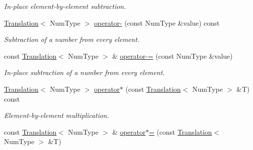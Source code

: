 \begin{DoxyCompactItemize}
\begin{DoxyCompactList}\small\item\em In-\/place element-\/by-\/element subtraction. \end{DoxyCompactList}\item 
\hypertarget{singletonscrews_1_1_translation_aa41f13916fce60d9775a0b6cb03a5952}{\hyperlink{singletonscrews_1_1_translation}{Translation}$<$ Num\+Type $>$ \hyperlink{singletonscrews_1_1_translation_aa41f13916fce60d9775a0b6cb03a5952}{operator-\/} (const Num\+Type \&value) const }\label{singletonscrews_1_1_translation_aa41f13916fce60d9775a0b6cb03a5952}

\begin{DoxyCompactList}\small\item\em Subtraction of a number from every element. \end{DoxyCompactList}\item 
\hypertarget{singletonscrews_1_1_translation_aafa1285cf0f6876d3b38bb3a61233f70}{const \hyperlink{singletonscrews_1_1_translation}{Translation}$<$ Num\+Type $>$ \& \hyperlink{singletonscrews_1_1_translation_aafa1285cf0f6876d3b38bb3a61233f70}{operator-\/=} (const Num\+Type \&value)}\label{singletonscrews_1_1_translation_aafa1285cf0f6876d3b38bb3a61233f70}

\begin{DoxyCompactList}\small\item\em In-\/place subtraction of a number from every element. \end{DoxyCompactList}\item 
\hypertarget{singletonscrews_1_1_translation_ad6490a44e641c53afb9e5fa41ac2971d}{\hyperlink{singletonscrews_1_1_translation}{Translation}$<$ Num\+Type $>$ \hyperlink{singletonscrews_1_1_translation_ad6490a44e641c53afb9e5fa41ac2971d}{operator$\ast$} (const \hyperlink{singletonscrews_1_1_translation}{Translation}$<$ Num\+Type $>$ \&T) const }\label{singletonscrews_1_1_translation_ad6490a44e641c53afb9e5fa41ac2971d}

\begin{DoxyCompactList}\small\item\em Element-\/by-\/element multiplication. \end{DoxyCompactList}\item 
\hypertarget{singletonscrews_1_1_translation_a20c44deabb886c1bbbd329610bee3012}{const \hyperlink{singletonscrews_1_1_translation}{Translation}$<$ Num\+Type $>$ \& \hyperlink{singletonscrews_1_1_translation_a20c44deabb886c1bbbd329610bee3012}{operator$\ast$=} (const \hyperlink{singletonscrews_1_1_translation}{Translation}$<$ Num\+Type $>$ \&T)}\label{singletonscrews_1_1_translation_a20c44deabb886c1bbbd329610bee3012}


\end{DoxyCompactItemize}
